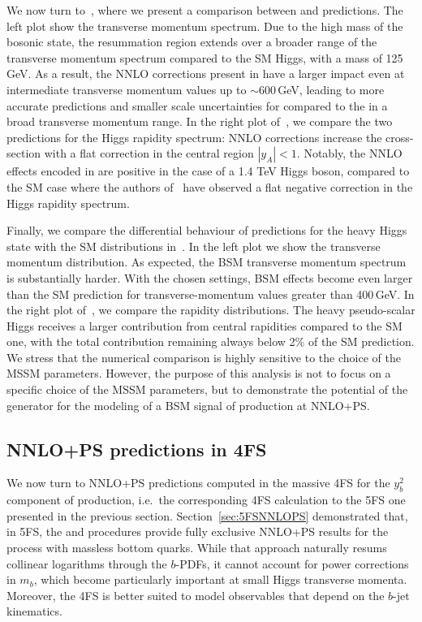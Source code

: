 \documentclass[11pt,a4paper]{article}
\begin{document}
We now turn to~, where we present a comparison between \minnlo{}  and \minlo{} predictions. 
The left plot show the transverse momentum spectrum.
Due to the high mass of the bosonic state, the resummation region extends over a broader range of the transverse momentum spectrum compared to the SM Higgs, with a mass of 125\,GeV. As a result, the NNLO corrections present in \minnlo{} have a larger impact even at intermediate transverse momentum values up to $\sim 600$\,GeV, leading to more accurate predictions and smaller scale uncertainties for \minnlo{} compared to the \minlo{} in a broad transverse momentum range. 
In the right plot of~, we compare the two predictions for the Higgs rapidity spectrum: NNLO corrections increase the cross-section with a flat correction in the central region $|y_A|<1$. Notably, the NNLO effects encoded in \minnlo{} are positive in the case of a 1.4 TeV Higgs boson, compared to the SM case where the authors of~ have observed a flat negative correction in the Higgs rapidity spectrum.

Finally, we compare the differential behaviour of \minnlo{} predictions for the heavy Higgs state with the SM distributions in~. In the left plot we show
the transverse momentum distribution. 
As expected, the BSM transverse momentum spectrum is substantially harder. With the chosen settings, BSM effects become even larger than the SM prediction for transverse-momentum values greater than 400\,GeV. 
In the right plot of~, we compare the rapidity distributions. The heavy pseudo-scalar Higgs receives a larger contribution from central rapidities compared to the SM one, with the total contribution remaining always below 2\% of the SM prediction. We stress that the numerical comparison is highly sensitive to the choice of the MSSM parameters. However, the purpose of this analysis is not to focus on a specific choice of the MSSM parameters, but to demonstrate the potential of the \minnlo{} generator 
for the modeling of a BSM signal of \bbH{} production at NNLO+PS.



\subsection{NNLO+PS predictions in 4FS}\label{sec:bbH4FS}

We now turn to NNLO+PS predictions computed in the massive 4FS for the $y_{b}^{2}$ component of \bbH{} production, i.e.\ the 
corresponding 4FS calculation to the 5FS one presented in the previous section.
Section~\ref{sec:5FSNNLOPS} demonstrated that, in 5FS, the \minnlo{} and \GENEVA{} procedures provide fully exclusive 
NNLO+PS results for the \bbH{} process with massless bottom quarks. While that approach naturally resums collinear logarithms 
through the $b$-PDFs, it cannot account for power corrections in $m_{b}$, which become particularly important at 
small Higgs transverse momenta. Moreover, the 4FS is better suited to model observables that depend on the $b$-jet kinematics.
\end{document}
